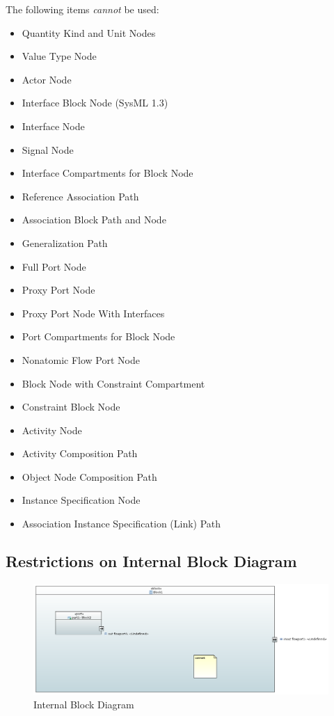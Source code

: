 The following items \emph{cannot} be used:
\begin{itemize}
\item Quantity Kind and Unit Nodes
\item Value Type Node
\item Actor Node
\item Interface Block Node (SysML 1.3)
\item Interface Node
\item Signal Node
\item Interface Compartments for Block Node
\item Reference Association Path
\item Association Block Path and Node
\item Generalization Path
\item Full Port Node
\item Proxy Port Node
\item Proxy Port Node With Interfaces
\item Port Compartments for Block Node
\item Nonatomic Flow Port Node
\item Block Node with Constraint Compartment
\item Constraint Block Node
\item Activity Node
\item Activity Composition Path
\item Object Node Composition Path
\item Instance Specification Node
\item Association Instance Specification (Link) Path
\end{itemize}

\subsection{Restrictions on Internal Block Diagram}



\begin{figure}[ht]
  \centering
  \includegraphics[width=\textwidth]{images/IBDDiagram.PNG}
  \caption{Internal Block Diagram}
  \label{fig:ibd}
\end{figure}


